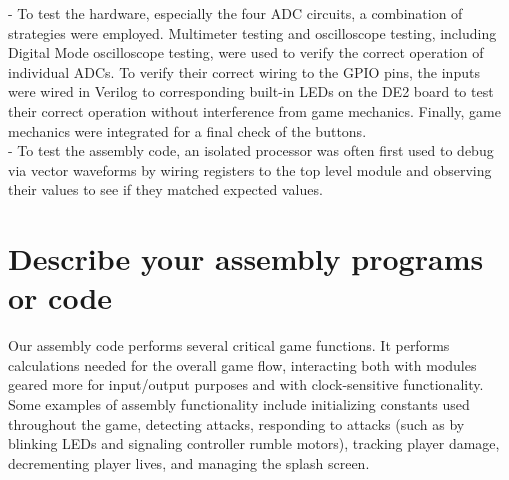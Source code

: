 \documentclass[12pt]{article} %
\begin{document}
- To test the hardware, especially the four ADC circuits, a combination of strategies were employed. Multimeter testing and oscilloscope testing, including Digital Mode oscilloscope testing, were used to verify the correct operation of individual ADCs. To verify their correct wiring to the GPIO pins, the inputs were wired in Verilog to corresponding built-in LEDs on the DE2 board to test their correct operation without interference from game mechanics. Finally, game mechanics were integrated for a final check of the buttons.\\

- To test the assembly code, an isolated processor was often first used to debug via vector waveforms by wiring registers to the top level module and observing their values to see if they matched expected values.\\

\section{Describe your assembly programs or code}
Our assembly code performs several critical game functions. It performs calculations needed for the overall game flow, interacting both with modules geared more for input/output purposes and with clock-sensitive functionality. Some examples of assembly functionality include initializing constants used throughout the game, detecting attacks, responding to attacks (such as by blinking LEDs and signaling controller rumble motors), tracking player damage, decrementing player lives, and managing the splash screen.
\end{document}
